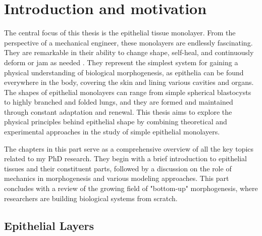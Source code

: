 \documentclass[11pt, final, a4paper, twoside, openright]{book}
\begin{document}
	\InitializeThesis
	
	 
	
	
	
	\frontmatter
	
	
	
	
	\mainmatter
	\part{Introduction and motivation}\label{part_1}
	
	The central focus of this thesis is the epithelial tissue monolayer. From the perspective of a mechanical engineer, these monolayers are endlessly fascinating. They are remarkable in their ability to change shape, self-heal, and continuously deform or jam as needed \cite{xi2018}. They represent the simplest system for gaining a physical understanding of biological morphogenesis, as epithelia can be found everywhere in the body, covering the skin and lining various cavities and organs. The shapes of epithelial monolayers can range from simple spherical blastocysts to highly branched and folded lungs, and they are formed and maintained through constant adaptation and renewal. This thesis aims to explore the physical principles behind epithelial shape by combining theoretical and experimental approaches in the study of simple epithelial monolayers.
	
	The chapters in this part serve as a comprehensive overview of all the key topics related to my PhD research. They begin with a brief introduction to epithelial tissues and their constituent parts, followed by a discussion on the role of mechanics in morphogenesis and various modeling approaches. This part concludes with a review of the growing field of "bottom-up" morphogenesis, where researchers are building biological systems from scratch.


	\renewcommand{\thesection}{1.\arabic{section}}
	\hypertarget{epithelial-layers}{%
	\chapter{Epithelial Layers}\label{epithelial-layers}}
	
\end{document}
